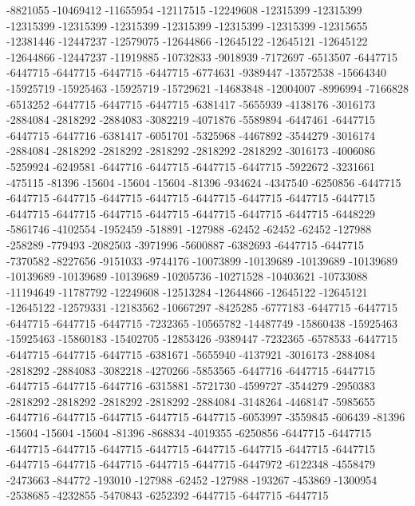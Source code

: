 -8821055 -10469412 -11655954 -12117515 -12249608 -12315399 -12315399 -12315399 -12315399 -12315399 -12315399 -12315399 -12315399 -12315655 -12381446 -12447237 -12579075 -12644866 -12645122 -12645121 -12645122 -12644866 -12447237 -11919885 -10732833 -9018939 -7172697 -6513507 -6447715 -6447715 -6447715 -6447715 -6447715 -6774631 -9389447 -13572538 -15664340 -15925719 -15925463 -15925719 -15729621 -14683848 -12004007 -8996994 -7166828 -6513252 -6447715 -6447715 -6447715 -6381417 -5655939 -4138176 -3016173 -2884084 -2818292 -2884083 -3082219 -4071876 -5589894 -6447461 -6447715 -6447715 -6447716 -6381417 -6051701 -5325968 -4467892 -3544279 -3016174 -2884084 -2818292 -2818292 -2818292 -2818292 -2818292 -3016173 -4006086 -5259924 -6249581 -6447716 -6447715 -6447715 -6447715 -5922672 -3231661 -475115 -81396 -15604 -15604 -15604 -81396 -934624 -4347540 -6250856 -6447715 -6447715 -6447715 -6447715 -6447715 -6447715 -6447715 -6447715 -6447715 -6447715 -6447715 -6447715 -6447715 -6447715 -6447715 -6447715 -6448229 -5861746 -4102554 -1952459 -518891 -127988 -62452 -62452 -62452 -127988 -258289 -779493 -2082503 -3971996 -5600887 -6382693 -6447715 -6447715
-7370582 -8227656 -9151033 -9744176 -10073899 -10139689 -10139689 -10139689 -10139689 -10139689 -10139689 -10205736 -10271528 -10403621 -10733088 -11194649 -11787792 -12249608 -12513284 -12644866 -12645122 -12645121 -12645122 -12579331 -12183562 -10667297 -8425285 -6777183 -6447715 -6447715 -6447715 -6447715 -6447715 -7232365 -10565782 -14487749 -15860438 -15925463 -15925463 -15860183 -15402705 -12853426 -9389447 -7232365 -6578533 -6447715 -6447715 -6447715 -6447715 -6381671 -5655940 -4137921 -3016173 -2884084 -2818292 -2884083 -3082218 -4270266 -5853565 -6447716 -6447715 -6447715 -6447715 -6447715 -6447716 -6315881 -5721730 -4599727 -3544279 -2950383 -2818292 -2818292 -2818292 -2818292 -2884084 -3148264 -4468147 -5985655 -6447716 -6447715 -6447715 -6447715 -6447715 -6053997 -3559845 -606439 -81396 -15604 -15604 -15604 -81396 -868834 -4019355 -6250856 -6447715 -6447715 -6447715 -6447715 -6447715 -6447715 -6447715 -6447715 -6447715 -6447715 -6447715 -6447715 -6447715 -6447715 -6447715 -6447972 -6122348 -4558479 -2473663 -844772 -193010 -127988 -62452 -127988 -193267 -453869 -1300954 -2538685 -4232855 -5470843 -6252392 -6447715 -6447715 -6447715
